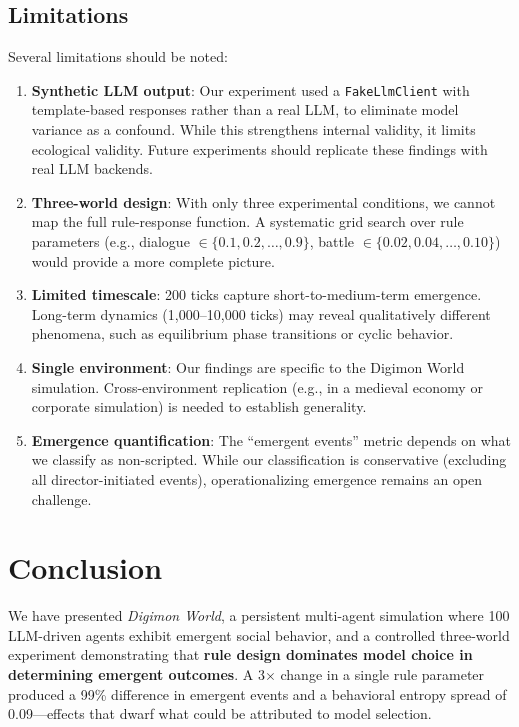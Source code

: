 \documentclass[11pt]{article}
\begin{document}
\subsection{Limitations}

Several limitations should be noted:

\begin{enumerate}[leftmargin=*,nosep]
    \item \textbf{Synthetic LLM output}: Our experiment used a \texttt{FakeLlmClient} with template-based responses rather than a real LLM, to eliminate model variance as a confound. While this strengthens internal validity, it limits ecological validity. Future experiments should replicate these findings with real LLM backends.
    \item \textbf{Three-world design}: With only three experimental conditions, we cannot map the full rule-response function. A systematic grid search over rule parameters (e.g., dialogue $\in \{0.1, 0.2, \ldots, 0.9\}$, battle $\in \{0.02, 0.04, \ldots, 0.10\}$) would provide a more complete picture.
    \item \textbf{Limited timescale}: 200 ticks capture short-to-medium-term emergence. Long-term dynamics (1{,}000--10{,}000 ticks) may reveal qualitatively different phenomena, such as equilibrium phase transitions or cyclic behavior.
    \item \textbf{Single environment}: Our findings are specific to the Digimon World simulation. Cross-environment replication (e.g., in a medieval economy or corporate simulation) is needed to establish generality.
    \item \textbf{Emergence quantification}: The ``emergent events'' metric depends on what we classify as non-scripted. While our classification is conservative (excluding all director-initiated events), operationalizing emergence remains an open challenge.
\end{enumerate}

\section{Conclusion}
\label{sec:conclusion}

We have presented \emph{Digimon World}, a persistent multi-agent simulation where 100 LLM-driven agents exhibit emergent social behavior, and a controlled three-world experiment demonstrating that \textbf{rule design dominates model choice in determining emergent outcomes}.
A 3$\times$ change in a single rule parameter produced a 99\% difference in emergent events and a behavioral entropy spread of 0.09---effects that dwarf what could be attributed to model selection.
\end{document}

